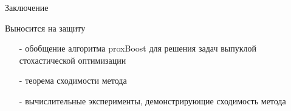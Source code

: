 \documentclass{beamer}
\begin{document}
\begin{frame}{Заключение}
     \begin{block}{Выносится на защиту}
     \begin{itemize}
         \item[-] обобщение алгоритма proxBoost для решения задач выпуклой стохастической оптимизации
         \item[-] теорема сходимости метода
         \item[-] вычислительные эксперименты, демонстрирующие сходимость метода 

     \end{itemize}
     \end{block}
     
 \end{frame}
\end{document}
